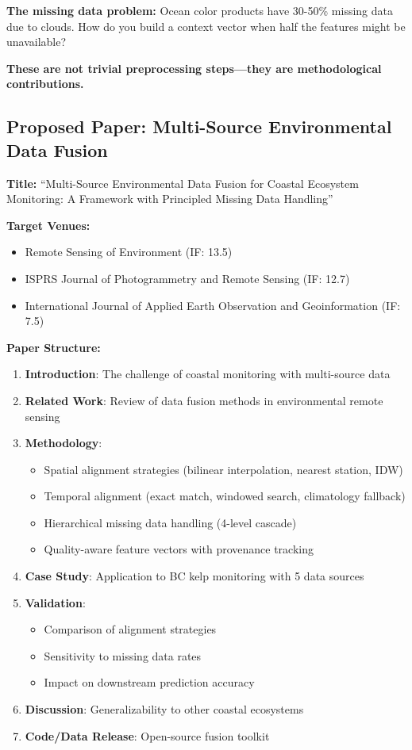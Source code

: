 \documentclass[11pt]{article}
\begin{document}
\textbf{The missing data problem:} Ocean color products have 30-50\% missing data due to clouds. How do you build a context vector when half the features might be unavailable?

\textbf{These are not trivial preprocessing steps---they are methodological contributions.}

\subsection{Proposed Paper: Multi-Source Environmental Data Fusion}

\textbf{Title:} ``Multi-Source Environmental Data Fusion for Coastal Ecosystem Monitoring: A Framework with Principled Missing Data Handling''

\textbf{Target Venues:}
\begin{itemize}
    \item Remote Sensing of Environment (IF: 13.5)
    \item ISPRS Journal of Photogrammetry and Remote Sensing (IF: 12.7)
    \item International Journal of Applied Earth Observation and Geoinformation (IF: 7.5)
\end{itemize}

\textbf{Paper Structure:}

\begin{enumerate}
    \item \textbf{Introduction}: The challenge of coastal monitoring with multi-source data
    \item \textbf{Related Work}: Review of data fusion methods in environmental remote sensing
    \item \textbf{Methodology}:
    \begin{itemize}
        \item Spatial alignment strategies (bilinear interpolation, nearest station, IDW)
        \item Temporal alignment (exact match, windowed search, climatology fallback)
        \item Hierarchical missing data handling (4-level cascade)
        \item Quality-aware feature vectors with provenance tracking
    \end{itemize}
    \item \textbf{Case Study}: Application to BC kelp monitoring with 5 data sources
    \item \textbf{Validation}:
    \begin{itemize}
        \item Comparison of alignment strategies
        \item Sensitivity to missing data rates
        \item Impact on downstream prediction accuracy
    \end{itemize}
    \item \textbf{Discussion}: Generalizability to other coastal ecosystems
    \item \textbf{Code/Data Release}: Open-source fusion toolkit
\end{enumerate}
\end{document}

